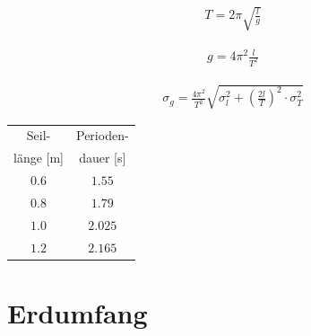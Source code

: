 \documentclass[12pt,a4paper,headinclude,bibtotoc]{scrartcl}
\begin{document}
\begin{align}
	T = 2\pi \sqrt{\frac{l}{g}}
\end{align}

\begin{align}
	g = 4\pi^2 \frac{l}{T^2}
\end{align}

\begin{align}
	\sigma_g = \frac{4\pi^2}{T^2} \sqrt{\sigma_l^2+\left(\frac{2l}{T}\right)^2 \cdot\sigma_T^2}
\end{align}

\begin{table}[!htb]
	\centering
	\begin{tabular}{|c|c|}
		\hline
		Seil- & Perioden- \\
		länge [m] & dauer [s] \\
		\hline
		$0.6$ & $1.55$\\
		$0.8$ & $1.79$\\
		$1.0$ & $2.025$\\
		$1.2$ & $2.165$\\
		\hline
	\end{tabular}
\end{table}

\begin{figure}[!htb]
	\centering
	
\end{figure}

\section{Erdumfang}
\end{document}
